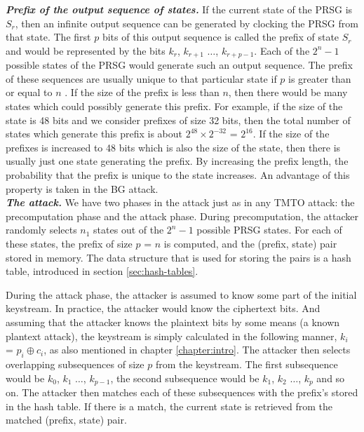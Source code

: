 \indent \textit{\textbf{Prefix of the output sequence of states.}} If the current state of the PRSG is $S_r$, then an infinite output sequence can be generated by clocking the PRSG from that state. The first $p$ bits of this output sequence is called the prefix of state $S_r$ and would be represented by the bits $k_r$, $k_{r+1}$ $\ldots$, $k_{r+p-1}$. Each of the $2^{n} - 1$ possible states of the PRSG would generate such an output sequence. The prefix of these sequences are usually unique to that particular state if $p$ is greater than or equal to $n$ \cite{biryukov2000rtc}. If the size of the prefix is less than $n$, then there would be many states which could possibly generate this prefix. For example, if the size of the state is 48 bits and we consider prefixes of size 32 bits, then the total number of states which generate this prefix is about $2^{48} \times 2^{-32}$ = $2^{16}$. If the size of the prefixes is increased to 48 bits which is also the size of the state, then there is usually just one state generating the prefix. By increasing the prefix length, the probability that the prefix is unique to the state increases. An advantage of this property is taken in the BG attack.\\

\indent \textit{\textbf{The attack.}} We have two phases in the attack just as in any TMTO attack: the precomputation phase and the attack phase. During precomputation, the attacker randomly selects $n_1$ states out of the $2^n - 1$ possible PRSG states. For each of these states, the prefix of size $p$ = $n$ is computed, and the (prefix, state) pair stored in memory. The data structure that is used for storing the pairs is a hash table, introduced in section \ref{sec:hash-tables}.

During the attack phase, the attacker is assumed to know some part of the initial keystream. In practice, the attacker would know the ciphertext bits. And assuming that the attacker knows the plaintext bits by some means (a known plantext attack), the keystream is simply calculated in the following manner, $k_i$ = $p_i \oplus c_i$, as also mentioned in chapter \ref{chapter:intro}. The attacker then selects overlapping subsequences of size $p$ from the keystream. The first subsequence would be $k_0$, $k_1$ $\ldots$, $k_{p-1}$, the second subsequence would be $k_1$, $k_2$ $\ldots$, $k_{p}$ and so on. The attacker then matches each of these subsequences with the prefix's stored in the hash table. If there is a match, the current state is retrieved from the matched (prefix, state) pair.\\

